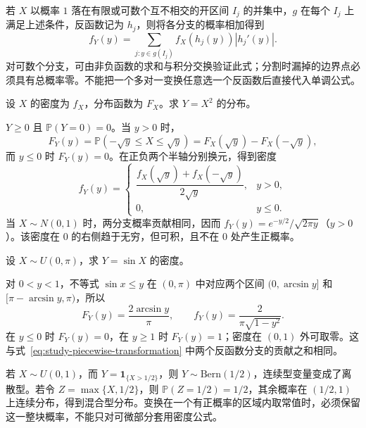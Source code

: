 若 $X$ 以概率 $1$ 落在有限或可数个互不相交的开区间 $I_j$ 的并集中，$g$ 在每个 $I_j$ 上满足上述条件，反函数记为 $h_j$，则将各分支的概率相加得到
\begin{equation}
  f_Y(y)=\sum_{j:y\in g(I_j)}f_X(h_j(y))|h_j'(y)|.
  \label{eq:study-piecewise-transformation}
\end{equation}
对可数个分支，可由非负函数的求和与积分交换验证此式；分割时漏掉的边界点必须具有总概率零。不能把一个多对一变换任意选一个反函数后直接代入单调公式。

\begin{example}
\label{ex:study-square-transformation}
设 $X$ 的密度为 $f_X$，分布函数为 $F_X$。求 $Y=X^2$ 的分布。
\end{example}

\begin{solve}
$Y\ge0$ 且 $\mathbb P(Y=0)=0$。当 $y>0$ 时，
\[
  F_Y(y)=\mathbb P(-\sqrt y\le X\le\sqrt y)
  =F_X(\sqrt y)-F_X(-\sqrt y),
\]
而 $y\le0$ 时 $F_Y(y)=0$。在正负两个半轴分别换元，得到密度
\begin{equation}
  f_Y(y)=\begin{cases}
    \dfrac{f_X(\sqrt y)+f_X(-\sqrt y)}{2\sqrt y},&y>0,\\
    0,&y\le0.
  \end{cases}
  \label{eq:study-square-density}
\end{equation}
当 $X\sim N(0,1)$ 时，两分支概率贡献相同，因而 $f_Y(y)=e^{-y/2}/\sqrt{2\pi y}$（$y>0$）。该密度在 $0$ 的右侧趋于无穷，但可积，且不在 $0$ 处产生正概率。
\end{solve}

\begin{example}
\label{ex:study-sine-transformation}
设 $X\sim U(0,\pi)$，求 $Y=\sin X$ 的密度。
\end{example}

\begin{solve}
对 $0<y<1$，不等式 $\sin x\le y$ 在 $(0,\pi)$ 中对应两个区间 $(0,\arcsin y]$ 和 $[\pi-\arcsin y,\pi)$，所以
\[
  F_Y(y)=\frac{2\arcsin y}{\pi},\qquad
  f_Y(y)=\frac{2}{\pi\sqrt{1-y^2}}.
\]
在 $y\le0$ 时 $F_Y(y)=0$，在 $y\ge1$ 时 $F_Y(y)=1$；密度在 $(0,1)$ 外可取零。这与式~\eqref{eq:study-piecewise-transformation} 中两个反函数分支的贡献之和相同。
\end{solve}

\begin{notealert}[type=caution,title={变换可能改变分布类型}]
若 $X\sim U(0,1)$，而 $Y=\mathbf 1_{\{X>1/2\}}$，则 $Y\sim\mathrm{Bern}(1/2)$，连续型变量变成了离散型。若令 $Z=\max\{X,1/2\}$，则 $\mathbb P(Z=1/2)=1/2$，其余概率在 $(1/2,1)$ 上连续分布，得到混合型分布。变换在一个有正概率的区域内取常值时，必须保留这一整块概率，不能只对可微部分套用密度公式。
\end{notealert}

